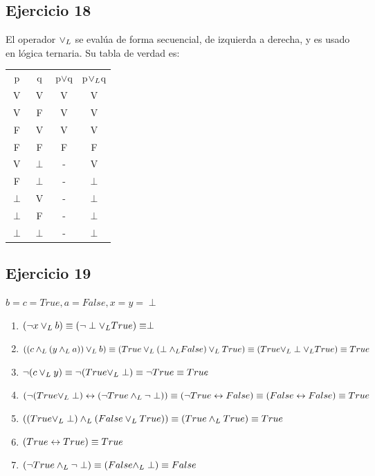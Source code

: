 	\subsection{Ejercicio 18}
		El operador $\lor _L$ se evalúa de forma secuencial, de izquierda a derecha, y es usado en lógica ternaria. Su tabla de verdad es:\\
		\begin{tabular}{c|c|c|c}
			p & q & p$\vee$q & p$\lor _L$q\\
			V & V & V & V\\
			V & F & V & V\\
			F & V & V & V\\
			F & F & F & F\\
			V & $\perp$ & - & V\\
			F & $\perp$ & - & $\perp$\\
			$\perp$ & V & - & $\perp$\\
			$\perp$ & F & - & $\perp$\\
			$\perp$ & $\perp$ & - & $\perp$\\
		\end{tabular}
	\subsection{Ejercicio 19}
		$b=c=True, a=False, x=y=\perp$
		\begin{enumerate}[label=(\alph*)]
		\item $(\neg x \lor _L b) \equiv (\neg \perp \lor _L True) \equiv \perp$
		\item $((c \land _L (y \land _L a))\lor _L b) \equiv (True \lor _L(\perp \land _L False)\lor _L True) \equiv (True \lor _L \perp \lor _L True) \equiv True$
		\item $\neg (c \lor _L y) \equiv \neg (True \lor _L \perp) \equiv \neg True \equiv True$
		\item $(\neg(True \lor _L \perp)\leftrightarrow(\neg True \land _L \neg \perp)) \equiv (\neg True \leftrightarrow False) \equiv (False \leftrightarrow False) \equiv True$
		\item $((True \lor _L \perp) \land _L (False \lor _L True)) \equiv (True \land _L True) \equiv True$
		\item $(True \leftrightarrow True) \equiv True$
		\item $(\neg True \land _L \neg \perp) \equiv (False \land _L \perp) \equiv False$
		\end{enumerate}
